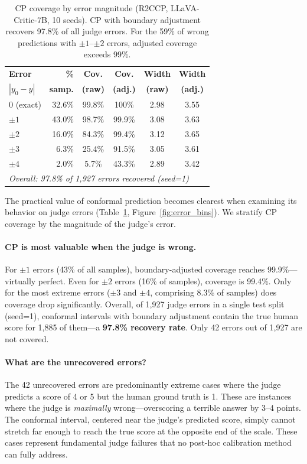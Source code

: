 \documentclass{article}
\begin{document}
\begin{table}[t]
\centering
\caption{CP coverage by error magnitude (R2CCP, LLaVA-Critic-7B, 10 seeds). CP with boundary adjustment recovers 97.8\% of all judge errors. For the 59\% of wrong predictions with $\pm 1$--$\pm 2$ errors, adjusted coverage exceeds 99\%.}
\label{tab:error_bins}
\small
\begin{tabular}{lrcccc}
\toprule
\textbf{Error} & \textbf{\%} & \textbf{Cov.} & \textbf{Cov.} & \textbf{Width} & \textbf{Width} \\
$|y_0 - y|$ & \textbf{samp.} & \textbf{(raw)} & \textbf{(adj.)} & \textbf{(raw)} & \textbf{(adj.)} \\
\midrule
0 (exact) & 32.6\% & 99.8\% & 100\% & 2.98 & 3.55 \\
$\pm 1$ & 43.0\% & 98.7\% & 99.9\% & 3.08 & 3.63 \\
$\pm 2$ & 16.0\% & 84.3\% & 99.4\% & 3.12 & 3.65 \\
$\pm 3$ & 6.3\% & 25.4\% & 91.5\% & 3.05 & 3.61 \\
$\pm 4$ & 2.0\% & 5.7\% & 43.3\% & 2.89 & 3.42 \\
\midrule
\multicolumn{6}{l}{\emph{Overall: 97.8\% of 1,927 errors recovered (seed=1)}} \\
\bottomrule
\end{tabular}
\end{table}

The practical value of conformal prediction becomes clearest when examining its behavior on judge errors (Table~\ref{tab:error_bins}, Figure~\ref{fig:error_bins}). We stratify CP coverage by the magnitude of the judge's error.

\paragraph{CP is most valuable when the judge is wrong.} For $\pm 1$ errors (43\% of all samples), boundary-adjusted coverage reaches 99.9\%---virtually perfect. Even for $\pm 2$ errors (16\% of samples), coverage is 99.4\%. Only for the most extreme errors ($\pm 3$ and $\pm 4$, comprising 8.3\% of samples) does coverage drop significantly. Overall, of 1,927 judge errors in a single test split (seed=1), conformal intervals with boundary adjustment contain the true human score for 1,885 of them---a \textbf{97.8\% recovery rate}. Only 42 errors out of 1,927 are not covered.

\paragraph{What are the unrecovered errors?} The 42 unrecovered errors are predominantly extreme cases where the judge predicts a score of 4 or 5 but the human ground truth is 1. These are instances where the judge is \emph{maximally} wrong---overscoring a terrible answer by 3--4 points. The conformal interval, centered near the judge's predicted score, simply cannot stretch far enough to reach the true score at the opposite end of the scale. These cases represent fundamental judge failures that no post-hoc calibration method can fully address.
\end{document}
